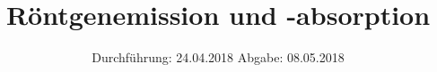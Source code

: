 

\subject{V602}
\title{Röntgenemission und -absorption}
\date{%
  Durchführung: 24.04.2018
  \hspace{3em}
  Abgabe: 08.05.2018
}



\maketitle
\thispagestyle{empty}
\tableofcontents
\newpage






\printbibliography{}


